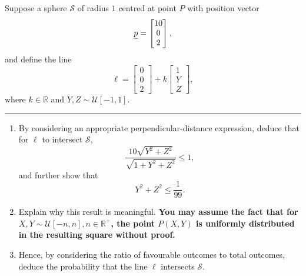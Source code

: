 \documentclass[12pt]{article}
\renewcommand{\vec}[1]{\undertilde{#1}}
\begin{document}
Suppose a sphere $\mathcal{S}$ of radius $1$ centred at point $P$ with position vector \[\vec{p}=\begin{bmatrix}
		10 \\
		0  \\
		2
	\end{bmatrix},\]
and define the line
\[\ell=\begin{bmatrix}
		0 \\
		0 \\
		2
	\end{bmatrix} + k\begin{bmatrix}
		1 \\
		Y \\
		Z
	\end{bmatrix},\]
  where $k\in \mathbb{R}$ and $Y, Z \sim \mathcal{U}[-1,1]$.
\vskip 8pt
\hrule
\begin{enumerate}
	\item[(i)] By considering an appropriate perpendicular-distance expression, deduce that for $\ell$ to intersect $\mathcal{S}$,
	      \[\dfrac{10\sqrt{Y^2+Z^2}}{\sqrt{1+Y^2+Z^2}} \leq 1,\]
	      and further show that
	      \[Y^2 + Z^2 \leq \dfrac{1}{99}.\]
	\item[(ii)] Explain why this result is meaningful.
	      \textbf{You may assume the fact that for $X, Y \sim \mathcal{U}[-n,n], n \in \mathbb{R}^+$, the point $P(X, Y)$ is uniformly distributed in the resulting square without proof.}
	\item[(iii)] Hence, by considering the ratio of favourable outcomes to total outcomes, deduce the probability that the line $\ell$ intersects $\mathcal{S}$.
\end{enumerate}
\end{document}
